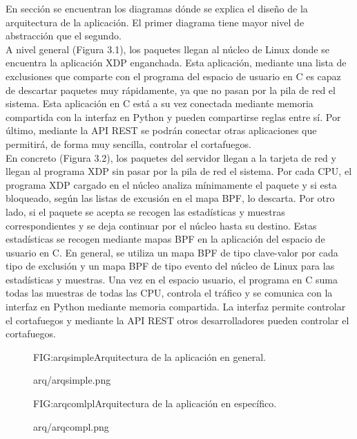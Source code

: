 En sección se encuentran los diagramas dónde se explica el diseño de la arquitectura de la aplicación. El primer diagrama tiene mayor nivel de abstracción que el segundo. 
\\A nivel general (Figura 3.1), los paquetes llegan al núcleo de Linux donde se encuentra la aplicación XDP enganchada. Esta aplicación, mediante una lista de exclusiones que comparte con el programa del espacio de usuario en C es capaz de descartar paquetes muy rápidamente, ya que no pasan por la pila de red el sistema. Esta aplicación en C está a su vez conectada mediante memoria compartida con la interfaz en Python y pueden compartirse reglas entre sí. Por último, mediante la API REST se podrán conectar otras aplicaciones que permitirá, de forma muy sencilla, controlar el cortafuegos.
\\En concreto (Figura 3.2), los paquetes del servidor llegan a la tarjeta de red y llegan al programa XDP sin pasar por la pila de red el sistema. Por cada CPU, el programa XDP cargado en el núcleo analiza mínimamente el paquete y si esta bloqueado, según las listas de excusión en el mapa BPF, lo descarta. Por otro lado, si el paquete se acepta se recogen las estadísticas y muestras correspondientes y se deja continuar por el núcleo hasta su destino. Estas estadísticas 
se recogen mediante mapas BPF en la aplicación del espacio de usuario en C. En general, se utiliza un mapa BPF de tipo clave-valor por cada tipo de exclusión y un mapa BPF de tipo evento del núcleo de Linux para las estadísticas y muestras. Una vez en el espacio usuario, el programa en C suma todas las muestras de todas las CPU, controla el tráfico y se comunica con la interfaz en Python mediante memoria compartida. La interfaz permite controlar el cortafuegos y mediante la API REST otros desarrolladores pueden controlar el cortafuegos.
\begin{figure}[Arquitectura de la aplicación en general.]{FIG:arqsimple}{Arquitectura de la aplicación en general.}
  \begin{image}{}{}{arq/arqsimple.png}
  \end{image}
\end{figure}
\begin{figure}[Arquitectura de la aplicación en específico.]{FIG:arqcomlpl}{Arquitectura de la aplicación en específico.}
  \begin{image}{}{}{arq/arqcompl.png}
  \end{image}
\end{figure}


\clearpage
